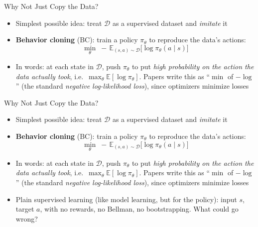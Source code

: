 
\begin{frame}{Why Not Just Copy the Data?}
\begin{itemize}
    \item Simplest possible idea: treat $\mathcal{D}$ as a supervised dataset and
          \emph{imitate} it
    \item \textbf{Behavior cloning} (BC): train a policy $\pi_\theta$ to
          reproduce the data's actions:
          \[ \min_\theta\; -\,\mathbb{E}_{(s,a)\sim\mathcal{D}}
             \big[\log \pi_\theta(a\mid s)\big] \]
    \item In words: at each state in $\mathcal{D}$, push $\pi_\theta$ to put
          \emph{high probability on the action the data actually took}, i.e.\
          $\max_\theta \mathbb{E}[\log \pi_\theta]$. Papers write this as
          ``$\min$ of $-\log$'' (the standard \emph{negative log-likelihood loss}),
          since optimizers minimize losses
\end{itemize}
\end{frame}

\begin{frame}{Why Not Just Copy the Data?}
\begin{itemize}
    \item Simplest possible idea: treat $\mathcal{D}$ as a supervised dataset and
          \emph{imitate} it
    \item \textbf{Behavior cloning} (BC): train a policy $\pi_\theta$ to
          reproduce the data's actions:
          \[ \min_\theta\; -\,\mathbb{E}_{(s,a)\sim\mathcal{D}}
             \big[\log \pi_\theta(a\mid s)\big] \]
    \item In words: at each state in $\mathcal{D}$, push $\pi_\theta$ to put
          \emph{high probability on the action the data actually took}, i.e.\
          $\max_\theta \mathbb{E}[\log \pi_\theta]$. Papers write this as
          ``$\min$ of $-\log$'' (the standard \emph{negative log-likelihood loss}),
          since optimizers minimize losses
    \item Plain supervised learning (like model learning, but for the policy):
          input $s$, target $a$, with no rewards, no Bellman, no bootstrapping.
          What could go wrong?
\end{itemize}
\end{frame}

